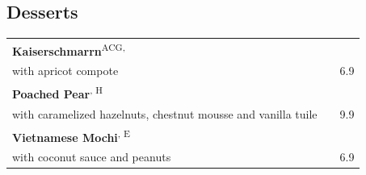 \documentclass[a4paper,12pt]{article}
\newcommand{\vegan}{\textbf{\scriptsize \color{vegan}{Vegan}}}
\newcommand{\vegetarisch}{\textbf{\scriptsize \color{vegan}{Veg}}}
\begin{document}
\begin{multicols}{2}
\section*{Desserts}
\begin{tabular}{Lrr}
\textbf{Kaiserschmarrn}\textsuperscript{{\scriptsize ACG, \vegetarisch}}\\
\hspace{0.4cm}\scriptsize with apricot compote & & 6.9\\
\textbf{Poached Pear}\textsuperscript{{\scriptsize \vegan, H}}\\
\hspace{0.4cm}\scriptsize with caramelized hazelnuts, chestnut mousse and vanilla tuile & & 9.9\\
\textbf{Vietnamese Mochi}\textsuperscript{{\scriptsize \vegan, E}}\\
\hspace{0.4cm}\scriptsize with coconut sauce and peanuts & & 6.9
\end{tabular}


\end{multicols}
\end{document}
